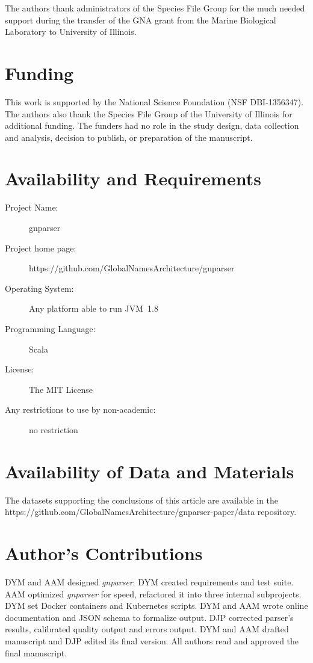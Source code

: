 \documentclass{bmcart}
\begin{document}
The authors thank administrators of the Species File Group for the much needed support during the transfer of the GNA grant from the Marine Biological Laboratory to University of Illinois.

\section*{Funding}

This work is supported by the National Science Foundation (NSF DBI-1356347). The authors also thank the Species File Group of the University of Illinois for additional funding. The funders had no role in the study design, data collection and analysis, decision to publish, or preparation of the manuscript.

\section*{Availability and Requirements}

\begin{description}
  \item[Project Name:] gnparser
  \item[Project home page:] https://github.com/GlobalNamesArchitecture/gnparser
  \item[Operating System:] Any platform able to run JVM~1.8
  \item[Programming Language:] Scala
  \item[License:] The MIT License
  \item[Any restrictions to use by non-academic:] no restriction
\end{description}

\section*{Availability of Data and Materials}
The datasets supporting the conclusions of this article are available in the  https://github.com/GlobalNamesArchitecture/gnparser-paper/data repository.

\section*{Author's Contributions}

DYM and AAM designed \textit{gnparser}. DYM created requirements and test suite. AAM optimized \textit{gnparser} for speed, refactored it into three internal subprojects. DYM set Docker containers and Kubernetes scripts. DYM and AAM wrote online documentation and JSON schema to formalize output. DJP corrected parser's results, calibrated quality output and errors output. DYM and AAM drafted manuscript and DJP edited its final version. All authors read and approved the final manuscript.
\end{document}
